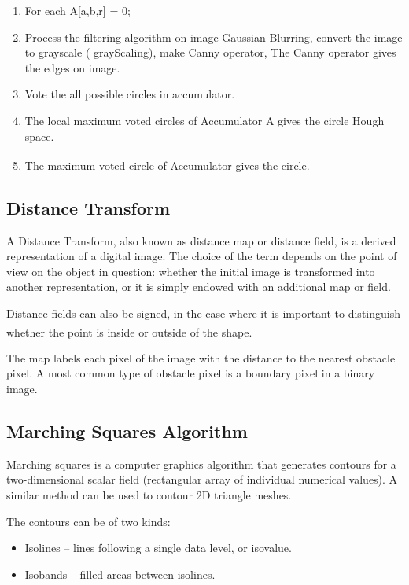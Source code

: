 \begin{enumerate}
    \item For each A[a,b,r] = 0;
    \item Process the filtering algorithm on image Gaussian Blurring, convert the image to grayscale ( grayScaling), make Canny operator, The Canny operator gives the edges on image.
    \item Vote the all possible circles in accumulator.
    \item The local maximum voted circles of Accumulator A gives the circle Hough space.
    \item The maximum voted circle of Accumulator gives the circle. \textsuperscript{\cite{circle-hough-transform}}
\end{enumerate}

\subsection{Distance Transform}
\hspace{\parindent}
A Distance Transform, also known as distance map or distance field, is a derived representation of a digital image. The choice of the term depends on the point of view on the object in question: whether the initial image is transformed into another representation, or it is simply endowed with an additional map or field.

Distance fields can also be signed, in the case where it is important to distinguish whether the point is inside or outside of the shape. \textsuperscript{\cite{frisken2000adaptively}}

The map labels each pixel of the image with the distance to the nearest obstacle pixel. A most common type of obstacle pixel is a boundary pixel in a binary image.

\subsection{Marching Squares Algorithm}
\hspace{\parindent}
Marching squares is a computer graphics algorithm that generates contours for a two-dimensional scalar field (rectangular array of individual numerical values). A similar method can be used to contour 2D triangle meshes.

The contours can be of two kinds:

\begin{itemize}
    \item Isolines – lines following a single data level, or isovalue.
    \item Isobands – filled areas between isolines.
\end{itemize}

